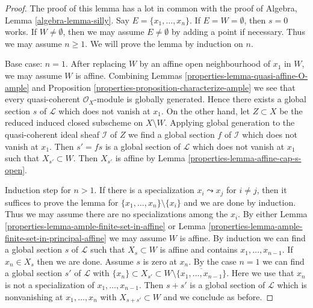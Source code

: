 \begin{proof}

The proof of this lemma has a lot in common with the proof of
Algebra, Lemma \ref{algebra-lemma-silly}.
Say $E = \{x_1, \ldots, x_n\}$. If $E = W = \emptyset$, then $s = 0$
works. If $W \not = \emptyset$, then we may assume $E \not = \emptyset$
by adding a point if necessary. Thus we may assume $n \geq 1$.
We will prove the lemma by induction on $n$.

\medskip\noindent
Base case: $n = 1$. After replacing $W$ by an affine open neighbourhood
of $x_1$ in $W$, we may assume $W$ is affine. Combining
Lemmas \ref{properties-lemma-quasi-affine-O-ample} and
Proposition \ref{properties-proposition-characterize-ample}
we see that every quasi-coherent
$\mathcal{O}_X$-module is globally generated.
Hence there exists
a global section $s$ of $\mathcal{L}$ which does not vanish at $x_1$.
On the other hand, let $Z \subset X$ be the
reduced induced closed subscheme on $X \setminus W$.
Applying global generation to the quasi-coherent ideal sheaf
$\mathcal{I}$ of $Z$ we find a global section $f$ of $\mathcal{I}$
which does not vanish at $x_1$. Then $s' = fs$ is a global section
of $\mathcal{L}$ which does not vanish at $x_1$ such that
$X_{s'} \subset W$. Then $X_{s'}$ is affine by
Lemma \ref{properties-lemma-affine-cap-s-open}.

\medskip\noindent
Induction step for $n > 1$. If there is a specialization
$x_i \leadsto x_j$ for $i \not = j$, then it suffices
to prove the lemma for $\{x_1, \ldots, x_n\} \setminus \{x_i\}$
and we are done by induction. Thus we may assume there are no
specializations among the $x_i$.
By either Lemma \ref{properties-lemma-ample-finite-set-in-affine} or
Lemma \ref{properties-lemma-ample-finite-set-in-principal-affine}
we may assume $W$ is affine.
By induction we can find a global section
$s$ of $\mathcal{L}$ such that $X_s \subset W$ is affine and contains
$x_1, \ldots, x_{n - 1}$. If $x_n \in X_s$ then we are done.
Assume $s$ is zero at $x_n$. By the case $n = 1$ we can find
a global section $s'$ of $\mathcal{L}$ with
$\{x_n\} \subset X_{s'} \subset
W \setminus \overline{\{x_1, \ldots, x_{n - 1}\}}$.
Here we use that $x_n$ is not a specialization of $x_1, \ldots, x_{n - 1}$.
Then $s + s'$
is a global section of $\mathcal{L}$ which is nonvanishing
at $x_1, \ldots, x_n$ with $X_{s + s'} \subset W$ and
we conclude as before.
\end{proof}

